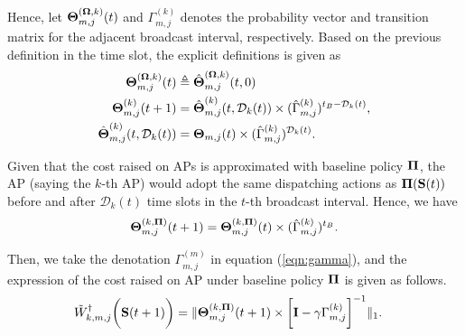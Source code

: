 Hence, let $\boldsymbol{\Theta}^{(\boldsymbol{\Omega}, k)}_{m,j}(t)$ and $\Gamma^{(k)}_{m,j}$ denotes the probability vector and transition matrix for the adjacent broadcast interval, respectively.
Based on the previous definition in the time slot, the explicit definitions is given as
\begin{align}
    \boldsymbol{\Theta}^{(\boldsymbol{\Omega}, k)}_{m,j}(t) &\triangleq \hat{\boldsymbol{\Theta}}^{(\boldsymbol{\Omega}, k)}_{m,j}(t,0)
    \\
    \boldsymbol{\Theta}^{(k)}_{m,j}(t+1) &= \hat{\boldsymbol{\Theta}}^{(k)}_{m,j}(t, \mathcal{D}_{k}(t)) \times (\hat{\Gamma}^{(k)}_{m,j})^{t_B-\mathcal{D}_{k}(t)},
    \nonumber\\
    \hat{\boldsymbol{\Theta}}^{(k)}_{m,j}(t, \mathcal{D}_{k}(t)) &= \boldsymbol{\Theta}_{m,j}(t) \times (\hat{\Gamma}^{(k)}_{m,j})^{\mathcal{D}_{k}(t)}.
\end{align}

Given that the cost raised on APs is approximated with baseline policy $\boldsymbol{\Pi}$, the AP (saying the $k$-th AP) would adopt the same dispatching actions as $\boldsymbol{\Pi}(\mathbf{S}(t))$ before and after $\mathcal{D}_{k}(t)$ time slots in the $t$-th broadcast interval.
Hence, we have
\begin{align}
    \boldsymbol{\Theta}^{(k,\boldsymbol{\Pi})}_{m,j}(t+1) = \boldsymbol{\Theta}^{(k,\boldsymbol{\Pi})}_{m,j}(t) \times (\hat{\Gamma}^{(k)}_{m,j})^{t_B}.
\end{align}

Then, we take the denotation $\Gamma^{(m)}_{m,j}$ in equation (\ref{eqn:gamma}), and the expression of the cost raised on AP under baseline policy $\boldsymbol{\Pi}$ is given as follows.
\begin{align}
    &\tilde{W}^{\dagger}_{k,m,j}\bigg(\mathbf{S}(t+1)\bigg) =
    \lVert
        \boldsymbol{\Theta}^{(k, \boldsymbol{\Pi})}_{m,j}(t+1) \times
        \bigg[
            \mathbf{I} - \gamma \Gamma^{(k)}_{m,j}
        \bigg]^{-1}
    \|_1.
\end{align}


